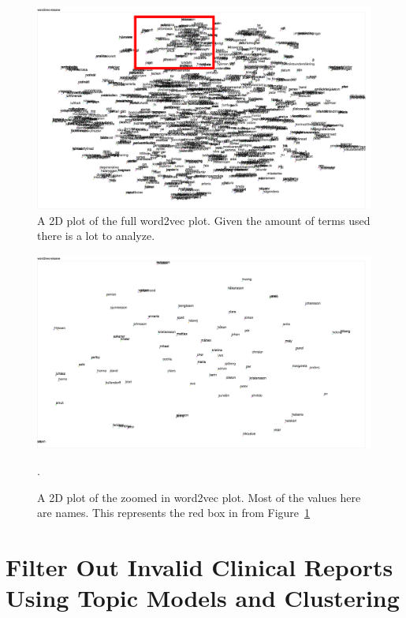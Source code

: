 \begin{figure}[h!]
    \centering
    \includegraphics[scale=0.25]{figures/word2vec-overview.png}
    \caption{A 2D plot of the full word2vec plot. Given the amount of terms used there is a lot to analyze.}
    \label{fig:word2vec-overview}
\end{figure}

\begin{figure}[h!]
    \centering
    \includegraphics[scale=0.25]{figures/word2vec-names.png}
    \caption{A 2D plot of the zoomed in word2vec plot. Most of the values here are names. This represents the red box in from Figure~\ref{fig:word2vec-overview}}.
    \label{fig:word2vec-names}
\end{figure}

\section{Filter Out Invalid Clinical Reports Using Topic Models and Clustering}\label{sec:exp1-result}

